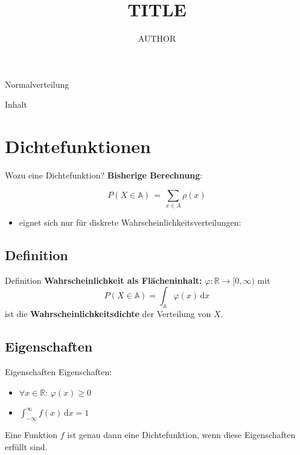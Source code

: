 \documentclass[14pt]{beamer}
\author{AUTHOR}
\title{TITLE}
\institute{Herder Gymnasium Berlin}
\date{}
\begin{document}
\begin{frame}{Normalverteilung}
\titlepage
\end{frame}

\begin{frame}{Inhalt}
\tableofcontents
\end{frame}

\section{Dichtefunktionen}
\begin{frame}{Wozu eine Dichtefunktion?}
\textbf{Bisherige Berechnung}:

{\small $$ P(X \in\mathbb{A}) \, = \, \sum_{x\in A} \rho(x) $$}
\begin{itemize}

\item eignet sich nur für diskrete Wahrscheinlichkeitsverteilungen:

\begin{itemize}
\end{itemize}
\end{itemize}

\end{frame}

\subsection{Definition}
\begin{frame}{Definition}
\textbf{Wahrscheinlichkeit als Flächeninhalt:}
$\varphi \colon \mathbb{R} \rightarrow [0,\infty)$ mit
$$P(X \in \mathbb{A})=\int_{\mathbb{A}} \varphi(x)\,{\mathrm d}x$$
ist die \textbf{Wahrscheinlichkeitsdichte} der Verteilung von $X$.
\end{frame}

\subsection{Eigenschaften}
\begin{frame}{Eigenschaften}
Eigenschaften:
\begin{itemize}
\item $\forall x \in \mathbb{R}:\, \varphi(x)\geq 0$
\item $\int_{-\infty}^\infty f(x)\,{\mathrm d}x = 1$
\end{itemize}
Eine Funktion $f$ ist genau dann eine Dichtefunktion, wenn diese Eigenschaften erfüllt sind.
\end{frame}
\end{document}
